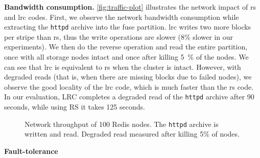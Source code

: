 \textbf{Bandwidth consumption.}
\label{subsec:network-traffic}
\autoref{fig:traffic-plot} illustrates the network impact of \ac{rs} and \ac{lrc} codes. 
First, we observe the network bandwidth consumption while extracting the \texttt{httpd} archive into the \ac{fuse} partition. 
\ac{lrc} writes two more blocks per stripe than \ac{rs}, thus the write operations are slower (8\% slower in our experiments). %
We then do the reverse operation and read the entire partition, once with all storage nodes intact and once after killing \SI{5}{\percent} of the nodes. 
We can see that \ac{lrc} is equivalent to \ac{rs} when the cluster is intact. 
However, with degraded reads (that is, when there are missing blocks due to failed nodes), we observe the good locality of the \ac{lrc} code, which is much faster than the \ac{rs} code. 
In our evaluation, LRC completes a degraded read of the \texttt{httpd} archive after 90 seconds, while using RS it takes 125 seconds.

\begin{figure*}
    \centering
    
    \caption{Network throughput of 100 Redis nodes. The \texttt{httpd} archive is written and read. Degraded read measured after killing 5\% of nodes.}
    \label{fig:traffic-plot}
\end{figure*}

\textbf{Fault-tolerance}
\label{subsec:fault-tolerance}

